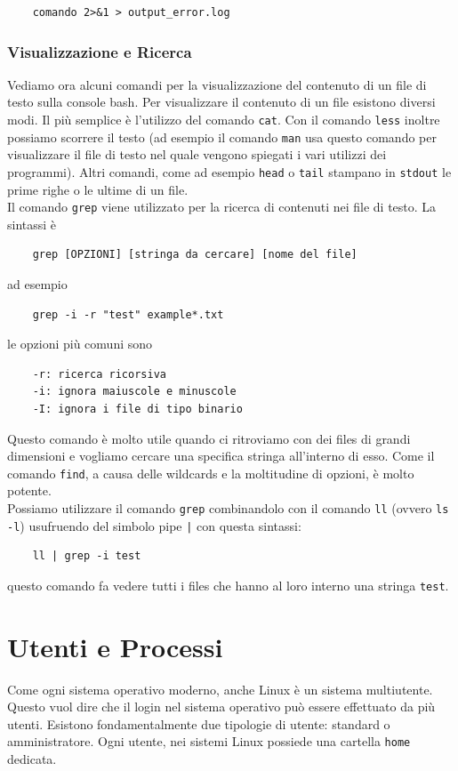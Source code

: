 \documentclass[11pt]{book}
\begin{document}
\begin{verbatim}
	comando 2>&1 > output_error.log
\end{verbatim}

\subsection{Visualizzazione e Ricerca}
Vediamo ora alcuni comandi per la visualizzazione del contenuto di un file di testo sulla console bash. Per visualizzare il contenuto di un file esistono diversi modi. Il più semplice è l'utilizzo del comando \verb"cat". Con il comando \verb"less" inoltre possiamo scorrere il testo (ad esempio il comando \verb"man" usa questo comando per visualizzare il file di testo nel quale vengono spiegati i vari utilizzi dei programmi). Altri comandi, come ad esempio \verb"head" o \verb"tail" stampano in \verb"stdout" le prime righe o le ultime di un file.\\
Il comando \verb"grep" viene utilizzato per la ricerca di contenuti nei file di testo. La sintassi è
\begin{verbatim}
	grep [OPZIONI] [stringa da cercare] [nome del file]
\end{verbatim} 
ad esempio

\begin{verbatim}
	grep -i -r "test" example*.txt
\end{verbatim}
le opzioni più comuni sono
\begin{verbatim}
	-r: ricerca ricorsiva
	-i: ignora maiuscole e minuscole
	-I: ignora i file di tipo binario
\end{verbatim}

Questo comando è molto utile quando ci ritroviamo con dei files di grandi dimensioni e vogliamo cercare una specifica stringa all'interno di esso. Come il comando \verb"find", a causa delle wildcards e la moltitudine di opzioni, è molto potente. \\
Possiamo utilizzare il comando \verb"grep" combinandolo con il comando \verb"ll" (ovvero \verb"ls -l") usufruendo del simbolo pipe \verb"|" con questa sintassi:
\begin{verbatim}
	ll | grep -i test
\end{verbatim}
questo comando fa vedere tutti i files che hanno al loro interno una stringa \verb"test".

\chapter{Utenti e Processi}
Come ogni sistema operativo moderno, anche Linux è un sistema multiutente. Questo vuol dire che il login nel sistema operativo può essere effettuato da più utenti. Esistono fondamentalmente due tipologie di utente: standard o amministratore. Ogni utente, nei sistemi Linux possiede una cartella \verb"home" dedicata. \\
\end{document}
